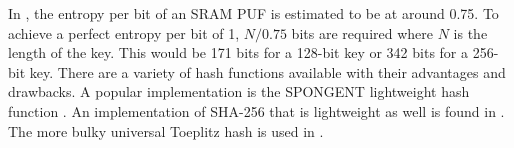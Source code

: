 In \cite{Guajarado_og,Bhargava2014}, the entropy per bit of an SRAM PUF is estimated to be at around 0.75. To achieve a perfect entropy per bit of 1, $N/0.75$ bits are required \cite{Guajarado_og} where $N$ is the length of the key. This would be 171 bits for a 128-bit key or 342 bits for a 256-bit key. There are a variety of hash functions available with their advantages and drawbacks. A popular implementation is the SPONGENT lightweight hash function \cite{Hiller2014, Maes2012}. An implementation of SHA-256 that is lightweight as well is found in \cite{VanDerLeest2012}. The more bulky universal Toeplitz hash is used in \cite{Maes2009}.